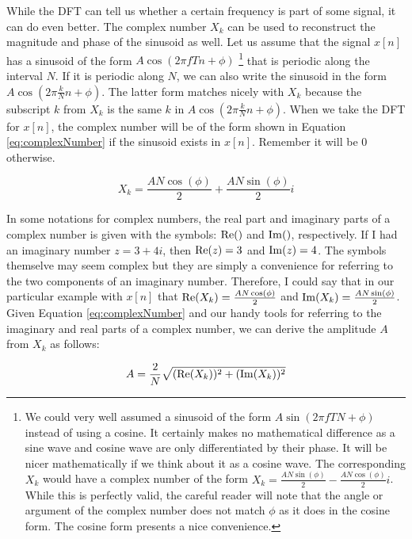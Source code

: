 While the DFT can tell us whether a certain frequency is part of some signal, it can do even better.  The complex
number $X_k$ can be used to reconstruct the magnitude and phase of the sinusoid as well.  Let us assume that
the signal $x[n]$ has a sinusoid of the form $A\cos(2\pi f Tn + \phi)$ \footnote{We could very well assumed a sinusoid of the form $A\sin(2\pi fTN + \phi)$ instead of using a 
cosine.  It certainly makes no mathematical difference as a sine wave and cosine wave are only differentiated
by their phase.  It will be nicer mathematically if we think about it as a cosine wave.  The corresponding
$X_k$ would have a complex number of the form $	X_k = \frac{AN\sin(\phi)}{2} - \frac{AN\cos(\phi)}{2}i$. While this is perfectly valid, the careful reader will note that the angle or argument of the complex number
does not match $\phi$ as it does in the cosine form.  The cosine form presents a nice convenience.} that is periodic along the interval $N$.  
If it is periodic along $N$, we can also write the sinusoid in the form $A\cos(2 \pi \frac{k}{N} n + \phi)$.  The
latter form matches nicely with $X_k$ because the subscript $k$ from $X_k$ is the same $k$ in 
$A\cos(2 \pi \frac{k}{N} n + \phi)$.  When we take the DFT for $x[n]$,  the complex number will be of the form
shown in Equation \ref{eq:complexNumber} if the sinusoid exists in $x[n]$.  Remember it will be 0 otherwise.

\begin{equation}
	\label{eq:complexNumber}
	X_k = \frac{AN\cos(\phi)}{2} + \frac{AN\sin(\phi)}{2}i
\end{equation}

 In some notations for complex numbers, the real part and imaginary parts of a complex number is 
 given with the symbols: $\mathrm{Re}()$ and $\mathrm{Im}()$, respectively.  If I had an imaginary number $z = 3 + 4i$, then
 $\mathrm{Re}(z) = 3$ and $\mathrm{Im}(z) = 4$.  The symbols themselve may seem complex but they are
 simply a convenience for referring to the two components of an imaginary number.  Therefore, I could say
 that in our particular example with $x[n]$ that $\mathrm{Re}(X_k) = \frac{AN\cos(\phi)}{2}$ and $\mathrm{Im}(X_k) = 
 \frac{AN\sin(\phi)}{2}$.  Given Equation \ref{eq:complexNumber} and our handy tools for referring to the
 imaginary and real parts of a complex number, we can derive the amplitude $A$ from $X_k$ as follows:


\begin{equation}
\label{eq:amplitude}
	A = \frac{2}{N}\sqrt{(\mathrm{Re}(X_k))^2 + (\mathrm{Im}(X_k))^2}
\end{equation}

